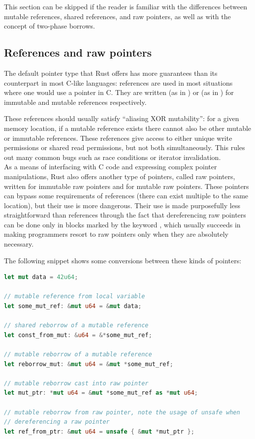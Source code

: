 \documentclass[a4paper,11pt]{article}
\theoremstyle{plain}
\theoremstyle{definition}
\theoremstyle{remark}
\newcommand{\tcode}[1]{\rstinline{#1}}
\begin{document}
This section can be skipped if the reader is familiar with the differences
between mutable references, shared references, and raw pointers, as well as
with the concept of two-phase borrows.

\subsection{References and raw pointers}

The default pointer type that Rust offers has more guarantees than its
counterpart in most C-like languages: references are used in most situations
where one would use a pointer in C.
They are written \tcode{\&} (as in \tcode{let x: \&T = \&t;})
or \tcode{\&mut} (as in \tcode{let x: \&mut T = \&mut t;})
for immutable and mutable references respectively.

These references should usually satisfy ``aliasing XOR mutability'': for a given memory
location, if a mutable reference exists there cannot also be other mutable or
immutable references. These references give access to either unique write permissions or
shared read permissions, but not both simultaneously. This rules out many common
bugs such as race conditions or iterator invalidation.\\


As a means of interfacing with C code and expressing complex pointer manipulations,
Rust also offers another type of pointers, called raw pointers, written
\tcode{*const T} for immutable raw pointers and \tcode{*mut T} for mutable
raw pointers. These pointers can bypass some requirements of references (there
can exist multiple \tcode{*mut T} to the same location), but their use is more
dangerous. Their use is made purposefully less straightforward than references
through the fact that dereferencing raw pointers can be done only in blocks marked by
the keyword \tcode{unsafe \{...\}}, which usually succeeds in making programmers resort
to raw pointers only when they are absolutely necessary.

The following snippet shows some conversions between these kinds of pointers:
\begin{lstlisting}[language=rust]
let mut data = 42u64;

// mutable reference from local variable
let some_mut_ref: &mut u64 = &mut data;

// shared reborrow of a mutable reference
let const_from_mut: &u64 = &*some_mut_ref;

// mutable reborrow of a mutable reference
let reborrow_mut: &mut u64 = &mut *some_mut_ref;

// mutable reborrow cast into raw pointer
let mut_ptr: *mut u64 = &mut *some_mut_ref as *mut u64;

// mutable reborrow from raw pointer, note the usage of unsafe when
// dereferencing a raw pointer
let ref_from_ptr: &mut u64 = unsafe { &mut *mut_ptr };
\end{lstlisting}
\end{document}
